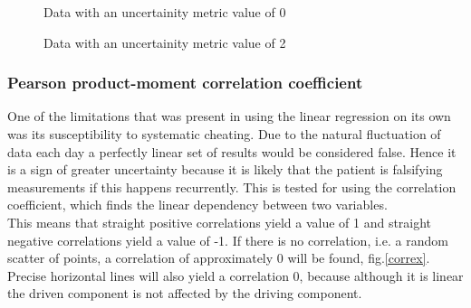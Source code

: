 \documentclass[11pt]{article}
\begin{document}
\begin{figure}[h!] 
\caption{Data with an uncertainity metric value of 0}
\endminipage\hfill
{}
\caption{Data with an uncertainity metric value of 2}
\endminipage
\end{figure} 

\subsubsection{Pearson product-moment correlation coefficient}
One of the limitations that was present in using the linear regression on its own was its susceptibility to systematic cheating. Due to the natural fluctuation of data each day a perfectly linear set of results would be considered false. Hence it is a sign of greater uncertainty because it is likely that the patient is falsifying measurements if this happens recurrently. This is tested for using the correlation coefficient, which finds the linear dependency between two variables. 
\\ \indent
This means that straight positive correlations yield a value of 1 and straight negative correlations yield a value of -1. If there is no correlation, i.e. a random scatter of points, a correlation of approximately 0 will be found, fig.\ref{correx}. Precise horizontal lines will also yield a correlation 0, because although it is linear the driven component is not affected by the driving component. 
\end{document}
